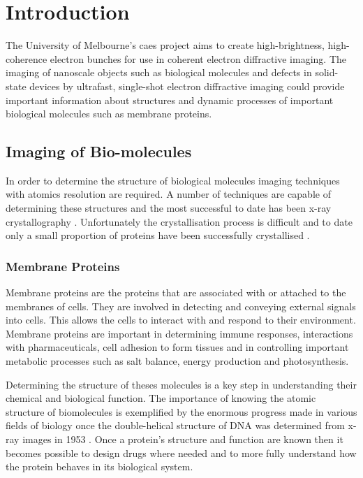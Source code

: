 \chapter{Introduction}

The University of Melbourne's \gls{caes} project aims to create high-brightness,  high-coherence electron bunches for use in coherent electron diffractive imaging. The imaging of nanoscale objects such as biological molecules \cite{dwyer_femtosecond_2006, williamson_clocking_1997} and defects in solid-state devices \cite{siwick_atomic-level_2003} by ultrafast, single-shot electron diffractive imaging could provide important information about structures and dynamic processes of important biological molecules such as membrane proteins.

\section{Imaging of Bio-molecules}

In order to determine the structure of biological molecules imaging techniques with atomics resolution are required. A number of techniques are capable of determining these structures \cite{nettleship_methods_2008, svergun_small-angle_2003, opella_structure_2004} and the most successful to date has been x-ray crystallography \cite{kendrew_three-dimensional_1958, uson_advances_1999}. Unfortunately the crystallisation process is difficult and to date only a small proportion of proteins have been successfully crystallised \cite{geerlof_impact_2006}.

\subsection{Membrane Proteins}
Membrane proteins are the proteins that are associated with or attached to the membranes of cells. They are involved in detecting and conveying external signals into cells. This allows the cells to interact with and respond to their environment\cite{almen_mapping_2009}. Membrane proteins are important in determining immune responses, interactions with pharmaceuticals, cell adhesion to form tissues and in controlling important metabolic processes such as salt balance, energy production and photosynthesis\cite{chiras_human_2011}.

Determining the structure of theses molecules is a key step in understanding their chemical and biological function. The importance of knowing the atomic structure of biomolecules is exemplified by the enormous progress made in various fields of biology once the double-helical structure of DNA was determined from x-ray images in 1953 \cite{watson_molecular_1953}. Once a protein's structure and function are known then it becomes possible to design drugs \cite{pinto_influenza_1992} where needed and to more fully understand how the protein behaves in its biological system.

